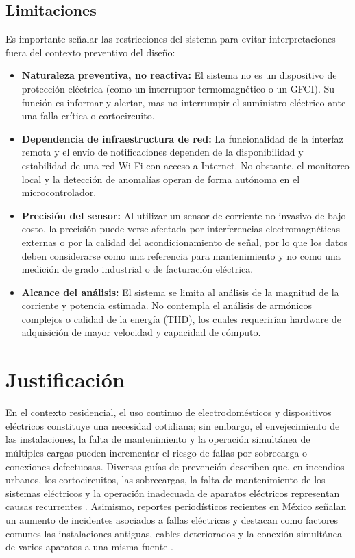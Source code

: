 ﻿\documentclass[12pt,openright,oneside]{report}
\theoremstyle{mytheoremstyle}
\theoremstyle{mytheoremstyle}
\theoremstyle{myproblemstyle}
\begin{document}
\subsection{Limitaciones}
\label{subsubsec:limitaciones}

Es importante señalar las restricciones del sistema para evitar interpretaciones fuera del contexto preventivo del diseño:

\begin{itemize}
    \item \textbf{Naturaleza preventiva, no reactiva:} El sistema no es un dispositivo de protección eléctrica (como un interruptor termomagnético o un GFCI). Su función es informar y alertar, mas no interrumpir el suministro eléctrico ante una falla crítica o cortocircuito.
    \item \textbf{Dependencia de infraestructura de red:} La funcionalidad de la interfaz remota y el envío de notificaciones dependen de la disponibilidad y estabilidad de una red Wi-Fi con acceso a Internet. No obstante, el monitoreo local y la detección de anomalías operan de forma autónoma en el microcontrolador.
    \item \textbf{Precisión del sensor:} Al utilizar un sensor de corriente no invasivo de bajo costo, la precisión puede verse afectada por interferencias electromagnéticas externas o por la calidad del acondicionamiento de señal, por lo que los datos deben considerarse como una referencia para mantenimiento y no como una medición de grado industrial o de facturación eléctrica.
    \item \textbf{Alcance del análisis:} El sistema se limita al análisis de la magnitud de la corriente y potencia estimada. No contempla el análisis de armónicos complejos o calidad de la energía (THD), los cuales requerirían hardware de adquisición de mayor velocidad y capacidad de cómputo.
\end{itemize}

\section{Justificación}
\label{subsec:justificacion}

En el contexto residencial, el uso continuo de electrodomésticos y dispositivos eléctricos constituye una necesidad cotidiana; sin embargo, el envejecimiento de las instalaciones, la falta de mantenimiento y la operación simultánea de múltiples cargas pueden incrementar el riesgo de fallas por sobrecarga o conexiones defectuosas. Diversas guías de prevención describen que, en incendios urbanos, los cortocircuitos, las sobrecargas, la falta de mantenimiento de los sistemas eléctricos y la operación inadecuada de aparatos eléctricos representan causas recurrentes \cite{unam-incendios}. Asimismo, reportes periodísticos recientes en México señalan un aumento de incidentes asociados a fallas eléctricas y destacan como factores comunes las instalaciones antiguas, cables deteriorados y la conexión simultánea de varios aparatos a una misma fuente \cite{azteca-fallas-electricas-incendios-2026}.
\end{document}

